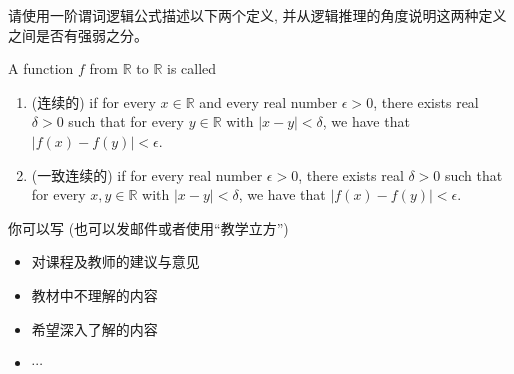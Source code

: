 \documentclass[a4paper, justified]{tufte-handout}
\begin{document}
\begin{problem}
  请使用一阶谓词逻辑公式描述以下两个定义,
  并从逻辑推理的角度说明这两种定义之间是否有强弱之分。

  A function $f$ from $\mathbb{R}$ to $\mathbb{R}$ is called
  \begin{enumerate}[(1)]
    \setlength{\itemsep}{10pt}
    \item {} (连续的) if
      for every $x \in \mathbb{R}$
      and every real number $\epsilon > 0$,
      there exists real $\delta > 0$ such that
      for every $y \in \mathbb{R}$ with $|x - y| < \delta$,
      we have that $|f(x) -  f(y)|< \epsilon$.
    \item {} (一致连续的) if
      for every real number $\epsilon > 0$,
      there exists real $\delta > 0$ such that
      for every $x, y \in \mathbb{R}$ with $|x - y| < \delta$,
      we have that $|f(x) -  f(y)|< \epsilon$.
  \end{enumerate}
\end{problem}

\begin{solution}
\end{solution}


\begincorrection

\beginfb

你可以写 (也可以发邮件或者使用``教学立方'')
\begin{itemize}
  \item 对课程及教师的建议与意见
  \item 教材中不理解的内容
  \item 希望深入了解的内容
  \item $\cdots$
\end{itemize}
\end{document}
